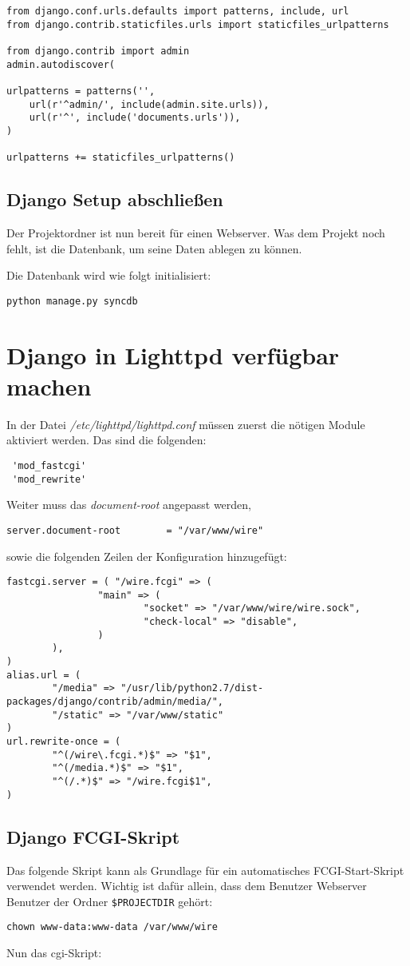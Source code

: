 \begin{lstlisting}
from django.conf.urls.defaults import patterns, include, url
from django.contrib.staticfiles.urls import staticfiles_urlpatterns

from django.contrib import admin
admin.autodiscover(

urlpatterns = patterns('',
    url(r'^admin/', include(admin.site.urls)),
    url(r'^', include('documents.urls')),
)

urlpatterns += staticfiles_urlpatterns()
\end{lstlisting}

 \subsection{Django Setup abschließen}
 Der Projektordner ist nun bereit für einen Webserver. Was dem Projekt noch
 fehlt, ist die Datenbank, um seine Daten ablegen zu können.

 Die Datenbank wird wie folgt initialisiert:
\begin{lstlisting}
python manage.py syncdb
\end{lstlisting}

\section{Django in Lighttpd verfügbar machen}
In der Datei \emph{/etc/lighttpd/lighttpd.conf} müssen zuerst die nötigen
Module aktiviert werden. Das sind die folgenden:
\begin{lstlisting}
 'mod_fastcgi'
 'mod_rewrite'
\end{lstlisting}

Weiter muss das \emph{document-root} angepasst werden,
\begin{lstlisting}
server.document-root        = "/var/www/wire"
\end{lstlisting}
sowie die folgenden Zeilen der Konfiguration hinzugefügt:
\begin{lstlisting}
fastcgi.server = ( "/wire.fcgi" => (
                "main" => (
                        "socket" => "/var/www/wire/wire.sock",
                        "check-local" => "disable",
                )
        ),
)
alias.url = (
        "/media" => "/usr/lib/python2.7/dist-packages/django/contrib/admin/media/",
        "/static" => "/var/www/static"
)
url.rewrite-once = (
        "^(/wire\.fcgi.*)$" => "$1",
        "^(/media.*)$" => "$1",
        "^(/.*)$" => "/wire.fcgi$1",
)
\end{lstlisting}

 \subsection{Django FCGI-Skript}
Das folgende Skript kann als Grundlage für ein automatisches FCGI-Start-Skript
verwendet werden. Wichtig ist dafür allein, dass dem Benutzer Webserver
Benutzer der Ordner
\lstinline{$PROJECTDIR} gehört:
\begin{lstlisting}
chown www-data:www-data /var/www/wire
\end{lstlisting}

Nun das \Gls{cgi}-Skript:

